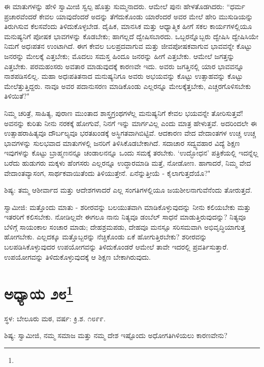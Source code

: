 ಈ ಮಾತುಗಳನ್ನು ಹೇಳಿ ಸ್ವಾಮೀಜಿ ಸ್ವಲ್ಪ ಹೊತ್ತು ಸುಮ್ಮನಾದರು. ಆಮೇಲೆ ಪುನಃ ಹೇಳತೊಡಗಿದರು: “ಧರ್ಮ ಪ್ರಚಾರವೆಂದರೆ ಕೇವಲ ಯಾವುದೆಂದರೆ ಅದನ್ನು ತೆಗೆದುಕೊಂಡು ಯಾರೆಂದರೆ ಅವರ ಮೇಲೆ ಹೇರಿ ಮುಸುಡಿಯನ್ನು ತಿರುಗಿಸುವ ಕೆಲಸವೆಂದು ತಿಳಿದುಕೊಳ್ಳಬೇಡ. ದೈಹಿಕ, ಮಾನಸಿಕ ಮತ್ತು ಆಧ್ಯಾತ್ಮಿಕ ಹೀಗೆ ಸಕಲ ಕಾರ್ಯಗಳಲ್ಲಿಯೂ ಮನುಷ್ಯನಿಗೆ ಪೋಷಕ ಭಾವಗಳನ್ನು ಕೊಡಬೇಕು; ಹಾಗಲ್ಲದೆ ದ್ವೇಷಿಸಬಾರದು. ಒಬ್ಬರನ್ನೊಬ್ಬರು ದ್ವೇಷಿಸಿ ದ್ವೇಷಿಸಿಯೇ ನಿಮಗೆ ಅಧಃಪತನ ಉಂಟಾಗಿದೆ. ಈಗ ಕೇವಲ ಬಲಪ್ರದವಾಗುವ ಮತ್ತು ಜೀವಪೋಷಕವಾಗುವ ಭಾವವನ್ನೇ ಕೊಟ್ಟು ಜನರನ್ನು ಮೇಲಕ್ಕೆ ಎತ್ತಬೇಕು; ಮೊದಲು ಸಮಸ್ತ ಹಿಂದೂ ಜನರನ್ನು ಹೀಗೆ ಎತ್ತಬೇಕು. ಆಮೇಲೆ ಜಗತ್ತನ್ನು ಎತ್ತಬೇಕು. ಪರಮಹಂಸರು ಅವತಾರ ಮಾಡುವುದಕ್ಕೆ ಕಾರಣವೇ ಇದು. ಅವರು ಜಗತ್ತಿನಲ್ಲಿ ಯಾರ ಭಾವವನ್ನೂ ನಾಶಪಡಿಸಲಿಲ್ಲ. ಮಹಾ ಅಧಃಪತಿತನಾದ ಮನುಷ್ಯನಿಗೂ ಅವರು ಅಭಯವನ್ನು ಕೊಟ್ಟು ಉತ್ಸಾಹವನ್ನು ಕೊಟ್ಟು ಮೇಲೆತ್ತುತ್ತಿದ್ದರು. ನಾವೂ ಅವರ ಪದಾನುಸರಣ ಮಾಡಿಕೊಂಡು ಎಲ್ಲರನ್ನೂ ಮೇಲಕ್ಕೆತ್ತಬೇಕು, ಎಚ್ಚರಗೊಳಿಸಬೇಕು ತಿಳಿಯಿತೆ?"

ನಿಮ್ಮ ಚರಿತ್ರೆ, ಸಾಹಿತ್ಯ, ಪುರಾಣ ಮುಂತಾದ ಶಾಸ್ತ್ರಗ್ರಂಥಗಳೆಲ್ಲ ಮನುಷ್ಯನಿಗೆ ಕೇವಲ ಭಯವನ್ನೇ ತೋರಿಸುತ್ತವೆ! ಅವನನ್ನು ಕುರಿತು ನೀನು ನರಕಕ್ಕೆ ಹೋಗುವೆ, ನಿನಗೆ ಇನ್ನು ಮಾರ್ಗವಿಲ್ಲ ಎಂದು ಮಾತ್ರ ಹೇಳುತ್ತವೆ. ಅದರಿಂದಲೇ ಈ ಉತ್ಸಾಹರಾಹಿತ್ಯವೂ ದೌರ್ಬಲ್ಯವೂ ಭರತಖಂಡಕ್ಕೆ ಅಸ್ಥಿಗತವಾಗಿಬಿಟ್ಟಿವೆ. ಆದಕಾರಣ ವೇದ ವೇದಾಂತಗಳ ಉಚ್ಚ ಉಚ್ಚ ಭಾವಗಳನ್ನು ಸುಲಭವಾದ ಮಾತುಗಳಲ್ಲಿ ಜನರಿಗೆ ತಿಳಿಸಿಕೊಡಬೇಕಾಗಿದೆ. ಸದಾಚಾರ ಸದ್ವ್ಯವಹಾರ ವಿದ್ಯೆ ಶಿಕ್ಷಣ ಇವುಗಳನ್ನು ಕೊಟ್ಟು ಬ್ರಾಹ್ಮಣನನ್ನೂ ಚಂಡಾಲನನ್ನೂ ಒಂದು ಸಮಕ್ಕೆ ತರಬೇಕು. ‘ಉದ್ಭೋಧನ’ ಪತ್ರಿಕೆಯಲ್ಲಿ ಇದನ್ನೆಲ್ಲ ಬರೆದು ಹುಡುಗರು ಮಕ್ಕಳು ಹೆಂಗಸರು ಎಲ್ಲರನ್ನೂ ಉದ್ಧಾರಮಾಡಿ ಮತ್ತೆ, ನೋಡೋಣ. ಹಾಗಾದರೆ, ನಿಮ್ಮ ವೇದ ವೇದಾಂತವ್ಯಾಸಂಗ, ಸಾರ್ಥಕವಾಯಿತೆಂದು ತಿಳಿಯುತ್ತೇನೆ. ಏನೆನ್ನುತ್ತೀಯೆ - ಕೈಲಾಗುತ್ತದೆಯೊ?"

ಶಿಷ್ಯ: ತಮ್ಮ ಆಶೀರ್ವಾದ ಮತ್ತು ಆದೇಶಗಳಾದರೆ ಎಲ್ಲ ಸಂಗತಿಗಳಲ್ಲಿಯೂ ಜಯಶೀಲನಾಗುವೆನೆಂದು ತೋರುತ್ತದೆ.

ಸ್ವಾಮೀಜಿ: ಮತ್ತೊಂದು ಮಾತು - ಶರೀರವನ್ನು ಬಲಯುತವಾಗಿ ಮಾಡಿಕೊಳ್ಳುವುದನ್ನು ನೀನು ಕಲಿಯಬೇಕು ಮತ್ತು ಇತರರಿಗೆ ಕಲಿಸಬೇಕು. ನೋಡಿಲ್ಲವೇ ಈಗಲೂ ನಾನು ನಿತ್ಯವೂ ಡಂಬೆಲ್ ಸಾಧನೆ ಮಾಡುತ್ತಿರುವುದನ್ನು? ನಿತ್ಯವೂ ಬೆಳಿಗ್ಗೆ ಸಾಯಂಕಾಲ ಸಂಚಾರ ಮಾಡು; ದೇಹಶ್ರಮಪಡು, ದೇಹವೂ ಮನಸ್ಸೂ ಸರಿಸಮವಾಗಿ ಅಭಿವೃದ್ಧಿಯಾಗುತ್ತ ಹೋಗಬೇಕು. ಎಲ್ಲದಕ್ಕೂ ಮತ್ತೊಬ್ಬರನ್ನು ನೆಚ್ಚಿಕೊಂಡು ಏಕೆ ಹೋಗುತ್ತಿರಬೇಕು? ಶರೀರವನ್ನು ಬಲಪಡಿಸಿಕೊಳ್ಳುವುದರ ಉಪಯೋಗವನ್ನು ತಿಳಿದುಕೊಂಡರೆ ಆಮೇಲೆ ತಾವೇ ಇದರಲ್ಲಿ ಪ್ರವರ್ತಿಸುತ್ತಾರೆ. ಉಪಯೋಗವನ್ನು ತಿಳಿದುಕೊಳ್ಳುವುದಕ್ಕೆ ಆ ಶಿಕ್ಷಣ ಬೇಕಾಗಿರುವುದು.

\newpage

\chapter[ಅಧ್ಯಾಯ ೨೮]{ಅಧ್ಯಾಯ ೨೮\protect\footnote{}}

\centerline{ಸ್ಥಳ: ಬೇಲೂರು ಮಠ, ವರ್ಷ: ಕ್ರಿ.ಶ. ೧೮೯೯.}

ಶಿಷ್ಯ: ಸ್ವಾಮೀಜಿ, ನಮ್ಮ ಸಮಾಜ ಮತ್ತು ನಮ್ಮ ದೇಶ ಇಷ್ಟೊಂದು ಅಧೋಗತಿಗಿಳಿಯಲು ಕಾರಣವೇನು?

